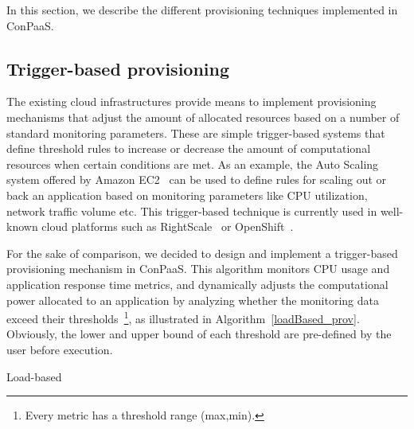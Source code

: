 In this section, we describe the different provisioning techniques implemented in ConPaaS.



\subsection{Trigger-based provisioning}




The existing cloud infrastructures provide means to implement
provisioning mechanisms that adjust the amount of allocated 
resources based on a number of standard monitoring parameters. 
These are simple trigger-based systems that define threshold 
rules to increase or decrease the amount of computational resources
when certain conditions are met. As an example, the Auto Scaling 
system offered by Amazon EC2~\cite{amazonEC2} can be used to define 
rules for scaling out or back an application based on monitoring
parameters like CPU utilization, network traffic volume etc. 
This trigger-based technique is currently used in well-known 
cloud platforms such as RightScale~\cite{right-scale} or OpenShift~\cite{openshift}. 

For the sake of comparison, we decided to design and implement a 
trigger-based provisioning mechanism in ConPaaS. This algorithm 
monitors CPU usage and application response time metrics, and 
dynamically adjusts the computational power allocated to an application by analyzing whether the monitoring data exceed their thresholds~\footnote{Every metric has a threshold range (max,min).}, as illustrated in Algorithm~\ref{loadBased_prov}. Obviously, the lower and upper bound of each threshold are pre-defined by the user before execution.

\begin{algorithm}
{\scriptsize
\SetAlgoLined
\SetInd{0mm}{2mm}
\BlankLine
\While{auto-scaling is ON}{
Collect monitoring data of each metric, \emph{data}\;
\BlankLine
\If{ no recent scaling operation}{
\uIf{ avg(data$_i$) $>=$ \emph{threshold\_min}$_i$  }{
ADD resources\;
}
\ElseIf{ avg(data$_i$) $<$ \emph{threshold\_max}$_i$  }{
REMOVE resources\;
} 
} 
Sleep for 5 minutes \; 
}
}
\caption{Load-based}
\label{loadBased_prov}
\end{algorithm}

